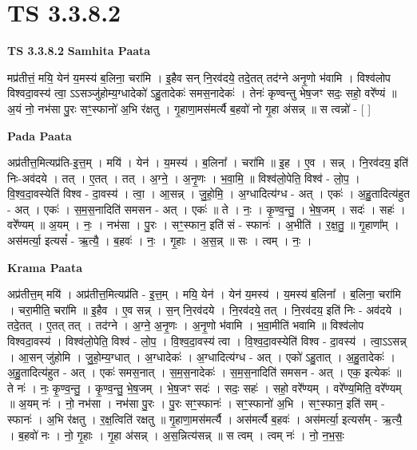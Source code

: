 \documentclass[17pt]{extarticle}
\begin{document}
\section{ TS 3.3.8.2 }

\textbf{TS 3.3.8.2 } \newline
\textbf{Samhita Paata} \newline

मप्र॑तीत्तं॒ मयि॒ येन॑ य॒मस्य॑ ब॒लिना॒ चरा॑मि । इ॒हैव सन् नि॒रव॑दये॒ तदे॒तत् तद॑ग्ने अनृ॒णो भ॑वामि । विश्व॑लोप विश्वदा॒वस्य॑ त्वा॒ ऽऽसञ्जु॑होम्य॒ग्धादेको॑ ऽहु॒तादेकः॑ समस॒नादेकः॑ । तेनः॑ कृण्वन्तु भेष॒जꣳ सदः॒ सहो॒ वरे᳚ण्यं ॥ अ॒यं नो॒ नभ॑सा पु॒रः सꣳ॒॒स्फानो॑ अ॒भि र॑क्षतु । गृ॒हाणा॒मस॑मर्त्यै ब॒हवो॑ नो गृ॒हा अ॑सन्न् ॥ स त्वन्नो॑ - [  ] \newline

\textbf{Pada Paata} \newline

अप्र॑तीत्त॒मित्यप्र॑ति-इ॒त्त॒म् । मयि॑ । येन॑ । य॒मस्य॑ । ब॒लिना᳚ । चरा॑मि ॥ इ॒ह । ए॒व । सन्न् । नि॒रव॑दय॒ इति॑ निः-अव॑दये । तत् । ए॒तत् । तत् । अ॒ग्ने॒ । अ॒नृ॒णः । भ॒वा॒मि॒ ॥ विश्व॑लो॒पेति॒ विश्व॑ - लो॒प॒ । वि॒श्व॒दा॒वस्येति॑ विश्व - दा॒वस्य॑ । त्वा॒ । आ॒सन्न् । जु॒हो॒मि॒ । अ॒ग्धादित्य॑ग्ध - अत् । एकः॑ । अ॒हु॒तादित्य॑हुत - अत् । एकः॑ । स॒म॒स॒नादिति॑ समसन - अत् । एकः॑ ॥ ते । नः॒ । कृ॒ण्व॒न्तु॒ । भे॒ष॒जम् । सदः॑ । सहः॑ । वरे᳚ण्यम् ॥ अ॒यम् । नः॒ । नभ॑सा । पु॒रः । सꣳ॒॒स्फान॒ इति॑ सं - स्फानः॑ । अ॒भीति॑ । र॒क्ष॒तु॒ ॥ गृ॒हाणा᳚म् । अस॑मर्त्या॒ इत्यसं᳚ - ऋ॒त्यै॒ । ब॒हवः॑ । नः॒ । गृ॒हाः । अ॒स॒न्न् ॥ सः । त्वम् । नः॒ ।  \newline


\textbf{Krama Paata} \newline

अप्र॑तीत्त॒म् मयि॑ । अप्र॑तीत्त॒मित्यप्र॑ति - इ॒त्त॒म् । मयि॒ येन॑ । येन॑ य॒मस्य॑ । य॒मस्य॑ ब॒लिना᳚ । ब॒लिना॒ चरा॑मि । चरा॒मीति॒ चरा॑मि ॥ इ॒हैव । ए॒व सन्न् । स॒न् नि॒रव॑दये । नि॒रव॑दये॒ तत् । नि॒रव॑दय॒ इति॑ निः - अव॑दये । तदे॒तत् । ए॒तत् तत् । तद॑ग्ने । अ॒ग्ने॒ अ॒नृ॒णः । अ॒नृ॒णो भ॑वामि । भ॒वा॒मीति॑ भवामि ॥ विश्व॑लोप विश्वदा॒वस्य॑ । विश्व॑लो॒पेति॒ विश्व॑ - लो॒प॒ । वि॒श्व॒दा॒वस्य॑ त्वा । वि॒श्व॒दा॒वस्येति॑ विश्व - दा॒वस्य॑ । त्वा॒ऽऽसन्न् । आ॒सन् जु॑होमि । जु॒हो॒म्य॒ग्धात् । अ॒ग्धादेकः॑ । अ॒ग्धादित्य॑ग्ध - अत् । एको॑ ऽहु॒तात् । अ॒हु॒तादेकः॑ । अ॒हु॒तादित्य॑हुत - अत् । एकः॑ समस॒नात् । स॒म॒स॒नादेकः॑ । स॒म॒स॒नादिति॑ समसन - अत् । एक॒ इत्येकः॑ ॥ ते नः॑ । नः॒ कृ॒ण्व॒न्तु॒ । कृ॒ण्व॒न्तु॒ भे॒ष॒जम् । भे॒ष॒जꣳ सदः॑ । सदः॒ सहः॑ । सहो॒ वरे᳚ण्यम् । वरे᳚ण्य॒मिति॒ वरे᳚ण्यम् ॥ अ॒यम् नः॑ । नो॒ नभ॑सा । नभ॑सा पु॒रः । पु॒रः सꣳ॒॒स्फानः॑ । सꣳ॒॒स्फानो॑ अ॒भि । सꣳ॒॒स्फान॒ इति॑ सम् - स्फानः॑ । अ॒भि र॑क्षतु । र॒क्ष॒त्विति॑ रक्षतु ॥ गृ॒हाणा॒मस॑मर्त्यै । अस॑मर्त्यै ब॒हवः॑ । अस॑मर्त्या॒ इत्यस᳚म् - ऋ॒त्यै॒ । ब॒हवो॑ नः । नो॒ गृ॒हाः । गृ॒हा अ॑सन्न् । अ॒स॒न्नित्य॑सन्न् ॥ स त्वम् । त्वम् नः॑ । नो॒ न॒भ॒सः॒ \newline
\end{document}
